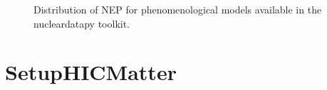 \documentclass[letterpaper,10pt,english]{sphinxmanual}
\begin{document}
\begin{figure}[htbp]
\centering
\capstart

\noindent{}
\caption{Distribution of NEP for phenomenological models available in the nucleardatapy toolkit.}\label{\detokenize{source/api/setup_pheno_matter:id9}}\end{figure}

\sphinxstepscope


\section{SetupHICMatter}
\label{\detokenize{source/api/setup_hic_matter:setuphicmatter}}\label{\detokenize{source/api/setup_hic_matter::doc}}\label{\detokenize{source/api/setup_hic_matter:module-nucleardatapy.setup_hic_matter}}
\end{document}
